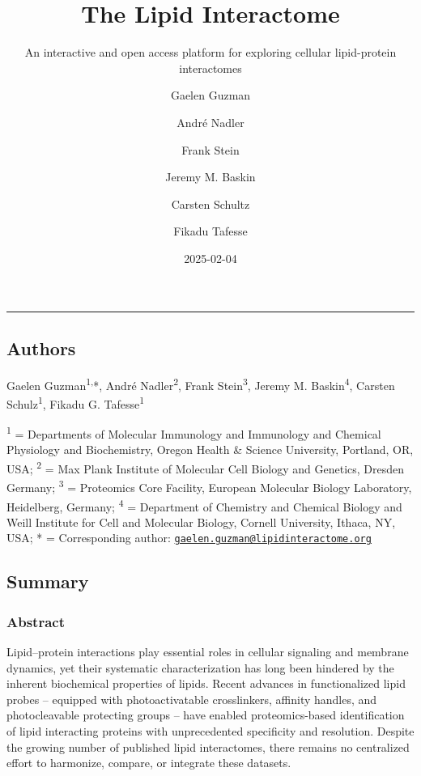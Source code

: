 \documentclass[
  letterpaper,
  DIV=11,
  numbers=noendperiod]{scrartcl}
\title{The Lipid Interactome}
\subtitle{An interactive and open access platform for exploring cellular
lipid-protein interactomes}
\author{Gaelen Guzman \and André Nadler \and Frank Stein \and Jeremy M.
Baskin \and Carsten Schultz \and Fikadu Tafesse}
\date{2025-02-04}
\begin{document}
\maketitle


\begin{center}\rule{0.5\linewidth}{0.5pt}\end{center}

\subsection{Authors}\label{authors}

Gaelen Guzman\textsuperscript{1,}*, André Nadler\textsuperscript{2},
Frank Stein\textsuperscript{3}, Jeremy M. Baskin\textsuperscript{4},
Carsten Schulz\textsuperscript{1}, Fikadu G. Tafesse\textsuperscript{1}

\textsuperscript{1} = Departments of Molecular Immunology and Immunology
and Chemical Physiology and Biochemistry, Oregon Health \& Science
University, Portland, OR, USA; \textsuperscript{2} = Max Plank Institute
of Molecular Cell Biology and Genetics, Dresden Germany;
\textsuperscript{3} = Proteomics Core Facility, European Molecular
Biology Laboratory, Heidelberg, Germany; \textsuperscript{4} =
Department of Chemistry and Chemical Biology and Weill Institute for
Cell and Molecular Biology, Cornell University, Ithaca, NY, USA; * =
Corresponding author:
\href{mailto:gaelen.guzman@lipidinteractome.org}{\nolinkurl{gaelen.guzman@lipidinteractome.org}}

\subsection{Summary}\label{summary}

\subsubsection{Abstract}\label{abstract}

Lipid--protein interactions play essential roles in cellular signaling
and membrane dynamics, yet their systematic characterization has long
been hindered by the inherent biochemical properties of lipids. Recent
advances in functionalized lipid probes -- equipped with
photoactivatable crosslinkers, affinity handles, and photocleavable
protecting groups -- have enabled proteomics-based identification of
lipid interacting proteins with unprecedented specificity and
resolution. Despite the growing number of published lipid interactomes,
there remains no centralized effort to harmonize, compare, or integrate
these datasets.
\end{document}

